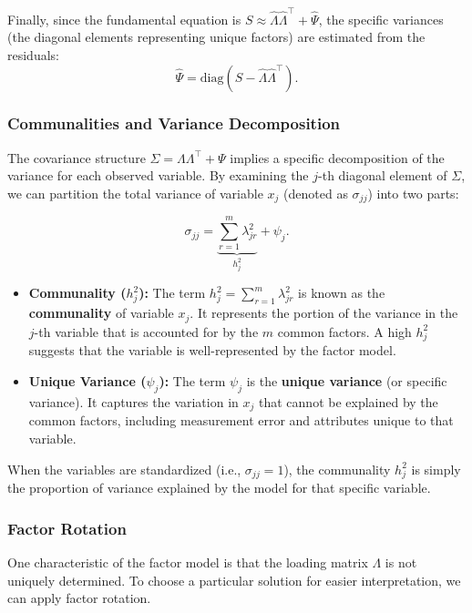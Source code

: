 \documentclass[12pt]{article}
\begin{document}
Finally, since the fundamental equation is $S \approx \widehat{\Lambda}\widehat{\Lambda}^\top + \widehat{\Psi}$, the specific variances (the diagonal elements representing unique factors) are estimated from the residuals:
\begin{equation}
\widehat{\Psi} = \text{diag}(S - \widehat{\Lambda}\widehat{\Lambda}^\top).
\end{equation}

\subsubsection{Communalities and Variance Decomposition}

The covariance structure $\Sigma = \Lambda \Lambda^\top + \Psi$ implies a specific decomposition of the variance for each observed variable. By examining the $j$-th diagonal element of $\Sigma$, we can partition the total variance of variable $x_j$ (denoted as $\sigma_{jj}$) into two parts:

\begin{equation}
\sigma_{jj} = \underbrace{\sum_{r=1}^{m} \lambda_{jr}^2}_{h_j^2} + \psi_j.
\end{equation}

\begin{itemize}
    \item \textbf{Communality ($h_j^2$):} The term $h_j^2 = \displaystyle\sum_{r=1}^{m} \lambda_{jr}^2$ is known as the \textbf{communality} of variable $x_j$. It represents the portion of the variance in the $j$-th variable that is accounted for by the $m$ common factors. A high $h_j^2$ suggests that the variable is well-represented by the factor model.
    \item \textbf{Unique Variance ($\psi_j$):} The term $\psi_j$ is the \textbf{unique variance} (or specific variance). It captures the variation in $x_j$ that cannot be explained by the common factors, including measurement error and attributes unique to that variable.
\end{itemize}

When the variables are standardized (i.e., $\sigma_{jj} = 1$), the communality $h_j^2$ is simply the proportion of variance explained by the model for that specific variable.

\subsubsection{Factor Rotation}

One characteristic of the factor model is that the loading matrix $\Lambda$ is not uniquely determined. 
To choose a particular solution for easier interpretation, we can apply factor rotation.
\end{document}
